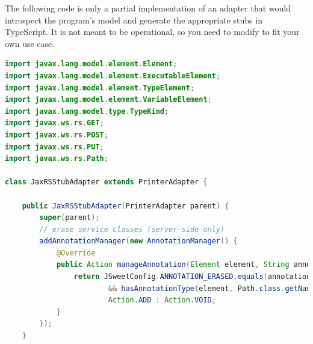 \documentclass[a4paper]{report}
\begin{document}
The following code is only a partial implementation of an adapter that would introspect the program's model and generate the appropriate stubs in TypeScript. It is not meant to be operational, so you need to modify to fit your own use case.

\begin{lstlisting}[language=Java]
import javax.lang.model.element.Element;
import javax.lang.model.element.ExecutableElement;
import javax.lang.model.element.TypeElement;
import javax.lang.model.element.VariableElement;
import javax.lang.model.type.TypeKind;
import javax.ws.rs.GET;
import javax.ws.rs.POST;
import javax.ws.rs.PUT;
import javax.ws.rs.Path;

class JaxRSStubAdapter extends PrinterAdapter {

	public JaxRSStubAdapter(PrinterAdapter parent) {
		super(parent);
		// erase service classes (server-side only)
		addAnnotationManager(new AnnotationManager() {
			@Override
			public Action manageAnnotation(Element element, String annotationType) {
				return JSweetConfig.ANNOTATION_ERASED.equals(annotationType)
						&& hasAnnotationType(element, Path.class.getName()) ? 
						Action.ADD : Action.VOID;
			}
		});
	}


\end{lstlisting}
\end{document}
